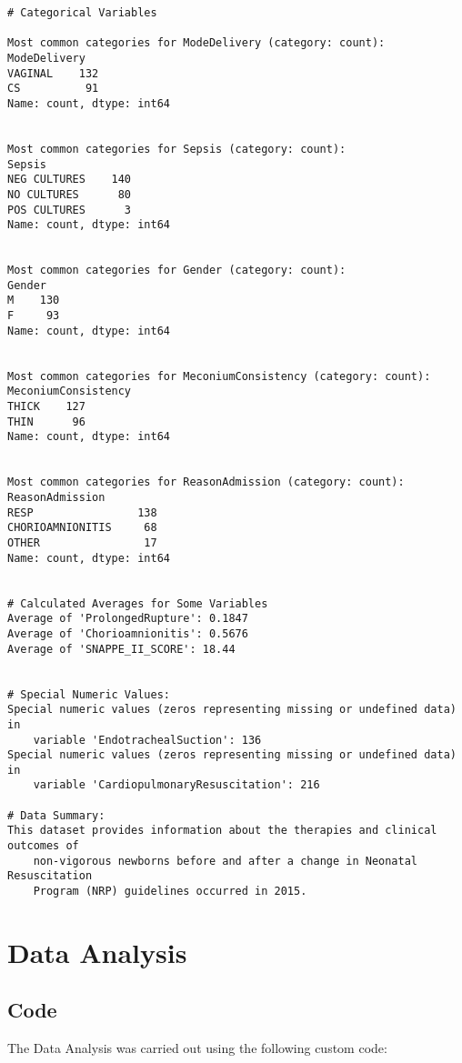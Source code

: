 \documentclass[11pt]{article}
\begin{document}
\begin{Verbatim}[tabsize=4]
# Categorical Variables

Most common categories for ModeDelivery (category: count):
ModeDelivery
VAGINAL    132
CS          91
Name: count, dtype: int64


Most common categories for Sepsis (category: count):
Sepsis
NEG CULTURES    140
NO CULTURES      80
POS CULTURES      3
Name: count, dtype: int64


Most common categories for Gender (category: count):
Gender
M    130
F     93
Name: count, dtype: int64


Most common categories for MeconiumConsistency (category: count):
MeconiumConsistency
THICK    127
THIN      96
Name: count, dtype: int64


Most common categories for ReasonAdmission (category: count):
ReasonAdmission
RESP                138
CHORIOAMNIONITIS     68
OTHER                17
Name: count, dtype: int64


# Calculated Averages for Some Variables
Average of 'ProlongedRupture': 0.1847
Average of 'Chorioamnionitis': 0.5676
Average of 'SNAPPE_II_SCORE': 18.44


# Special Numeric Values:
Special numeric values (zeros representing missing or undefined data) in
	variable 'EndotrachealSuction': 136
Special numeric values (zeros representing missing or undefined data) in
	variable 'CardiopulmonaryResuscitation': 216

# Data Summary:
This dataset provides information about the therapies and clinical outcomes of
	non-vigorous newborns before and after a change in Neonatal Resuscitation
	Program (NRP) guidelines occurred in 2015.

\end{Verbatim}

\section{Data Analysis} \subsection{Code}The Data Analysis was carried out using the following custom code:
\end{document}
